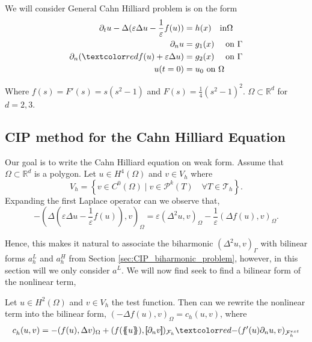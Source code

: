 We will consider General Cahn Hilliard problem is on the form
\begin{equation}
\label{eq:ch_exact}
    \begin{split}
        \partial _{t} u  - \Delta ( \varepsilon  \Delta u - \frac{1}{\varepsilon } f( u) ) & =  h(x)  \quad \text{in} \Omega \\
        \partial _{n} u & =  g_{1}(x)  \quad \text{ on } \Gamma \\
          \partial _{n} ( \red{ f( u) + \varepsilon } \Delta u ) & = g_{2}(x)  \quad \text{ on } \Gamma  \\
        u(t=0) & = u_{0}   \text{ on } \Omega
    \end{split}
\end{equation}

Where $f( s)  = F' ( s)=s( s^2 -1)  $ and $F( s)  = \frac{1}{4} ( s^2 - 1)^2 $. $\Omega \subset \mathbb{R} ^{d} $  for $d = 2,3$.



\subsection{ CIP method for the Cahn Hilliard Equation}%
\label{sub:writing_the_cahn_hilliard_equation_of_weak_form}

Our goal is to write the Cahn Hilliard equation on weak form.
Assume that $\Omega  \subset \mathbb{R} ^{d}$ is a polygon.
 Let $u \in  H^{4}( \Omega ) $ and $v \in V_{h} $ where
\[
V_{h} = \left\{ v \in C^{0}( \Omega )   \mid v\in \mathcal{P} ^{k} ( T) \quad \forall T \in \mathcal{T} _{h} \right\}.
\]
Expanding the first Laplace operator can we observe that,
\[
- ( \Delta ( \varepsilon  \Delta u - \frac{1}{\varepsilon } f( u) ) ,v )_{\Omega } = \varepsilon ( \Delta^{2} u ,v )_{\Omega } - \frac{1}{\varepsilon } ( \Delta f( u)  ,v )_{\Omega }.
\]

Hence, this makes it natural to associate the biharmonic $( \Delta ^2 u,v)_{\Gamma } $ with bilinear forms $a_h^{L} $ and $a^{H}_{h} $ from Section \ref{sec:CIP_biharmonic_problem}, however, in this section will we only consider $a^{L}$.
We will now find seek to find a bilinear form of the nonlinear term,

\begin{lemma}
    Let $u \in H^2( \Omega ) $ and $v \in V_{h}$ the test function.
Then can we rewrite the nonlinear term into the bilinear form, $( -\Delta f( u) , v)_{\Omega } = c_{h}(u,v )   $, where
\[
    c^{}_{h} ( u,v) = - ( f( u), \Delta v )_{ \Omega } + ( f( \mean{ u }  ), \jump{ \partial _{n} v }   )_{\mathcal{F}_{h} }  \red{- ( f' (  u  )  \partial _{n}u ,  v      )_{\mathcal{F}_{h} ^{ext}}}
\]

\end{lemma}

